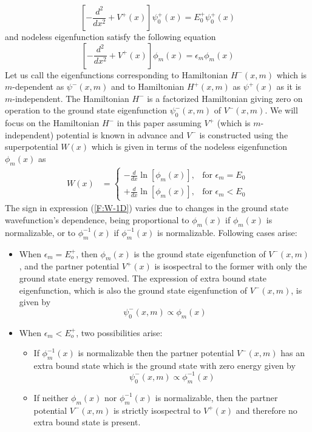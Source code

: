 \documentclass[12pt]{article}
\numberwithin{equation}{section} %
\begin{document}
\begin{equation}
    \left[-\frac{d^2}{dx^2}+V^+(x)\right]\psi_0^+(x)=E_0^+\psi_0^+(x)
\end{equation}
and nodeless eigenfunction satisfy the following equation
\begin{equation}
    \left[-\frac{d^2}{dx^2}+V^+(x)\right]\phi_m(x)=\epsilon_m\phi_m(x)
\end{equation}
Let us call the eigenfunctions corresponding to Hamiltonian \( H^-(x,m) \) which is $m$-dependent as \( \psi^-(x,m) \) and to Hamiltonian \( H^+(x,m) \) as \( \psi^+(x) \) as it is $m$-independent. The 
Hamiltonian $H^-$ is a factorized Hamiltonian giving zero on operation to the 
ground state eigenfunction $\psi_0^-(x,m)$ of $V^-(x,m)$.
We will focus on the Hamiltonian $H^-$ in this paper assuming $V^+$ (which is $m$-independent) potential 
is known in advance and $V^-$ is constructed using the superpotential \( W(x) \) which is given in terms of the nodeless eigenfunction \( \phi_m(x) \) as
\begin{align}
    W(x)&=\begin{cases}\label{F:W-1D}
        -\frac{d}{dx}\ln[\phi_m(x)], & \text{for } \epsilon_m=E_0\\
        +\frac{d}{dx}\ln[\phi_m(x)], & \text{for } \epsilon_m<E_0
    \end{cases}
\end{align}
The sign in expression (\ref{F:W-1D}) varies due to changes in the ground state wavefunction's dependence, being proportional to \( \phi_m(x) \) if \( \phi_m(x) \) is normalizable, or to \( \phi_m^{-1}(x) \) if \( \phi_m^{-1}(x) \) is normalizable. Following cases \cite{marquette2013two} arise:
\begin{itemize}
    \item When $\epsilon_m=E_o^+$, then \( \phi_m(x) \) is the ground state eigenfunction of \( V^-(x,m) \), and the partner potential \( V^+(x) \) is isospectral to the former with only the ground state energy removed. The expression of extra bound state eigenfunction, which is also the ground state eigenfunction of \( V^-(x,m) \), is given by
    \begin{equation}\label{F:GS-I}
        \psi^-_0(x,m)\propto\phi_m(x)
    \end{equation}

    \item When $\epsilon_m<E_o^+$, two possibilities arise:
    \begin{itemize}
        \item If \( \phi_m^{-1}(x) \) is normalizable then the partner potential \( V^-(x,m) \) has an extra bound state which is the ground state with zero energy given by
        \begin{equation}\label{F:GS-III}
            \psi^-_0(x,m) \propto\phi^{-1}_m(x)
        \end{equation} 

        \item If neither \( \phi_m(x) \) nor \( \phi^{-1}_m(x) \) is normalizable, then the partner potential \( V^-(x,m) \) is strictly isospectral to \( V^+(x) \) and therefore no extra bound state is present.
    \end{itemize}
\end{itemize}
\end{document}
